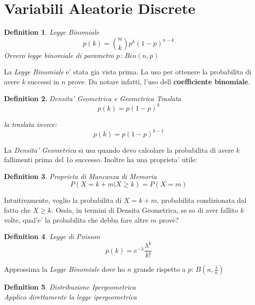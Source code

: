 \documentclass{article}
\newtheorem{definition}{Definition}[section]
\begin{document}
    \newpage
    \section{Variabili Aleatorie Discrete}
    \begin{definition} Legge Binomiale \\
        $$
        p(k) = \binom{n}{k}p^k (1-p)^{n-k}
        $$
        Ovvero legge binomiale di parametro $p$: $Bin(n,p)$
    \end{definition}

    La \textit{Legge Binomiale} e' stata gia vista prima. La uso per ottenere la probabilita
    di avere $k$ successi in $n$ prove. Da notare infatti, l'uso dell \textbf{coefficiente binomiale}.

    \begin{definition} Densita' Geometrica e Geometrica Traslata \\
        $$
        p(k) = p(1-p)^k
        $$

        la traslata invece:
        $$
        p(k) = p(1-p)^{k-1}
        $$
    \end{definition}

    La \textit{Densita' Geometrica} si usa quando devo calcolare la probabilita di avere $k$ fallimenti
    prima del 1o successo. Inoltre ha una proprieta' utile:

    \begin{definition} Proprieta di Mancanza di Memoria
        $$
        P(X=k+m|X\geq k) = P(X=m)
        $$
    \end{definition}

    Intuitivamente, voglio la probabilita di $X=k+m$, probabilita condizionata dal fatto che $X \geq k$. 
    Ossia, in termini di Densita Geometrica, se so di aver fallito $k$ volte, qual'e' la probabilita che debba 
    fare altre $m$ prove?

    \begin{definition} Legge di Poisson
        $$
        p(k) = e^{-\lambda} \frac{\lambda^k}{k!}
        $$
    \end{definition}

    Approssima la \textit{Legge Binomiale} dove ho $n$ grande rispetto a $p$: $B(n,\frac{\lambda}{n})$

    \begin{definition} Distribuzione Ipergeometrica \\
        Applico direttamente la legge ipergeometrica
    \end{definition}
\end{document}
